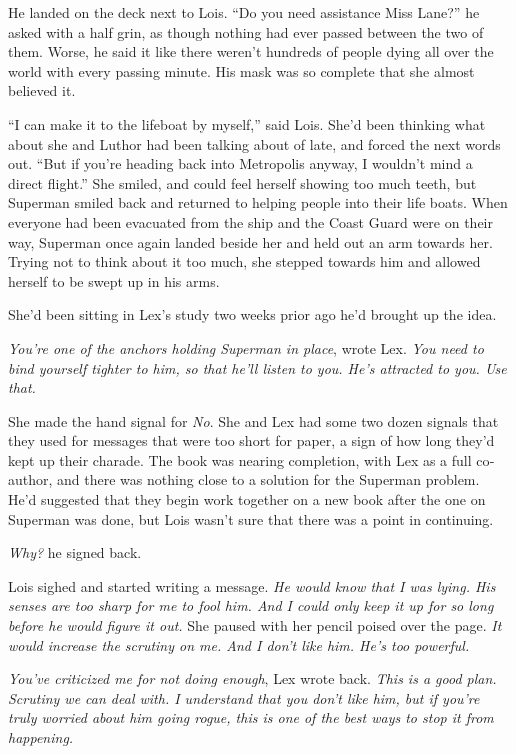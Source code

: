 \documentclass[ebook,12pt]{memoir}
\begin{document}
He landed on the deck next to Lois. ``Do you need assistance Miss
Lane?'' he asked with a half grin, as though nothing had ever passed
between the two of them. Worse, he said it like there weren't hundreds
of people dying all over the world with every passing minute. His mask
was so complete that she almost believed it.

``I can make it to the lifeboat by myself,'' said Lois. She'd been
thinking what about she and Luthor had been talking about of late, and
forced the next words out. ``But if you're heading back into Metropolis
anyway, I wouldn't mind a direct flight.'' She smiled, and could feel
herself showing too much teeth, but Superman smiled back and returned to
helping people into their life boats. When everyone had been evacuated
from the ship and the Coast Guard were on their way, Superman once again
landed beside her and held out an arm towards her. Trying not to think
about it too much, she stepped towards him and allowed herself to be
swept up in his arms.

She'd been sitting in Lex's study two weeks prior ago he'd brought up
the idea.

\emph{You're one of the anchors holding Superman in place}, wrote Lex.
\emph{You need to bind yourself tighter to him, so that he'll listen to
you. He's attracted to you. Use that.}

She made the hand signal for \emph{No}. She and Lex had some two dozen
signals that they used for messages that were too short for paper, a
sign of how long they'd kept up their charade. The book was nearing
completion, with Lex as a full co‐author, and there was nothing close to
a solution for the Superman problem. He'd suggested that they begin work
together on a new book after the one on Superman was done, but Lois
wasn't sure that there was a point in continuing.

\emph{Why?} he signed back.

Lois sighed and started writing a message. \emph{He would know that I
was lying. His senses are too sharp for me to fool him. And I could only
keep it up for so long before he would figure it out.} She paused with
her pencil poised over the page. \emph{It would increase the scrutiny on
me. And I don't like him. He's too powerful.}

\emph{You've criticized me for not doing enough}, Lex wrote back.
\emph{This is a good plan. Scrutiny we can deal with. I understand that
you don't like him, but if you're truly worried about him going rogue,
this is one of the best ways to stop it from happening.}
\end{document}
